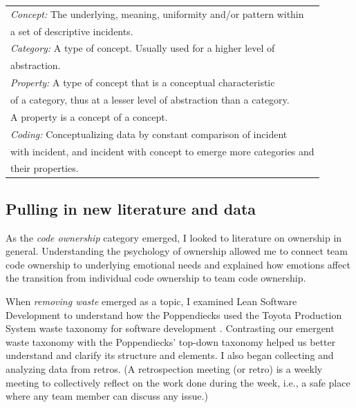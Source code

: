 \begin{table}[t]
\renewcommand{\arraystretch}{1.5}
\centering
{}
\label{glaserDefinitions}
\begin{tabular}{|l|}
\hline
\textit{Concept:} The underlying, meaning, uniformity and/or pattern within \\ a set of descriptive incidents. \\ 
\textit{Category:} A type of concept. Usually used for a higher level of \\ abstraction. \\
\textit{Property:} A type of concept that is a conceptual characteristic \\ of a category, thus at a lesser level of abstraction than a category. \\ A property is a concept of a concept. \\ 
\textit{Coding:} Conceptualizing data by constant comparison of incident \\ with incident, and incident with concept to emerge more categories and \\ their properties.
\\ \hline
\end{tabular}
\end{table}


\subsection{Pulling in new literature and data}
As the \textit{code ownership} category emerged, I looked to literature on ownership in general. Understanding the psychology of ownership \cite{Pierce2001} allowed me to connect team code ownership to underlying emotional needs and explained how emotions affect the transition from individual code ownership to team code ownership.

When \textit{removing waste} emerged as a topic, I examined Lean Software Development to understand how the Poppendiecks used the Toyota Production System waste taxonomy for software development \cite{PoppendieckConceptToCash}. Contrasting our emergent waste taxonomy with the Poppendiecks' top-down taxonomy helped us better understand and clarify its structure and elements. I also began collecting and analyzing data from retros. (A retrospection meeting (or retro) is a weekly meeting to collectively reflect on the work done during the week, i.e., a safe place where any team member can discuss any issue.) 

